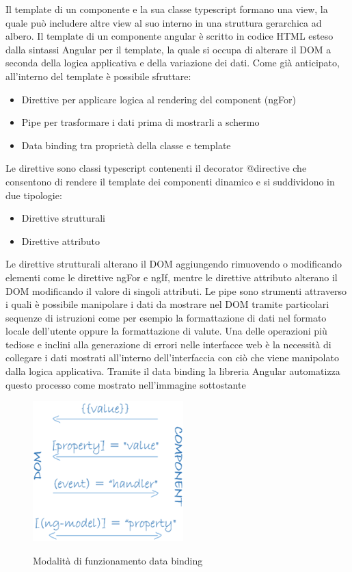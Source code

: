 Il template di un componente e la sua classe typescript formano una view, la quale può includere altre view al suo interno in una struttura gerarchica ad albero.
\newline
Il template di un componente angular è scritto in codice HTML esteso dalla sintassi Angular per il template, la quale si occupa di alterare il DOM a seconda della logica applicativa e della variazione dei dati.
Come già anticipato, all'interno del template è possibile sfruttare:
\begin{itemize}
    \item Direttive per applicare logica al rendering del component (ngFor)
    \item Pipe per trasformare i dati prima di mostrarli a schermo
    \item Data binding tra proprietà della classe e template
\end{itemize}
Le direttive sono classi typescript contenenti il decorator @directive che consentono di rendere il template dei componenti dinamico e si suddividono in due tipologie:
\begin{itemize}
    \item Direttive strutturali
    \item Direttive attributo
\end{itemize}
Le direttive strutturali alterano il DOM aggiungendo rimuovendo o modificando elementi come le direttive ngFor e ngIf,
mentre le direttive attributo alterano il DOM modificando il valore di singoli attributi.
\newline
\newline
Le pipe sono strumenti attraverso i quali è possibile manipolare i dati da mostrare nel DOM tramite particolari sequenze di istruzioni come per esempio la formattazione di dati nel formato locale dell'utente oppure la formattazione di valute.
\newline
\newline
Una delle operazioni più tediose e inclini alla generazione di errori nelle interfacce web è la necessità di collegare i dati mostrati all'interno dell'interfaccia con ciò che viene manipolato dalla logica applicativa. Tramite il data binding la libreria Angular automatizza questo processo come mostrato nell'immagine sottostante
\newline
\newline
\begin{figure}[H]
    \centering
    \includegraphics[scale=1]{resources/databinding.png}
    \cite{angular-doc}
    \caption{Modalità di funzionamento data binding}
\end{figure}
